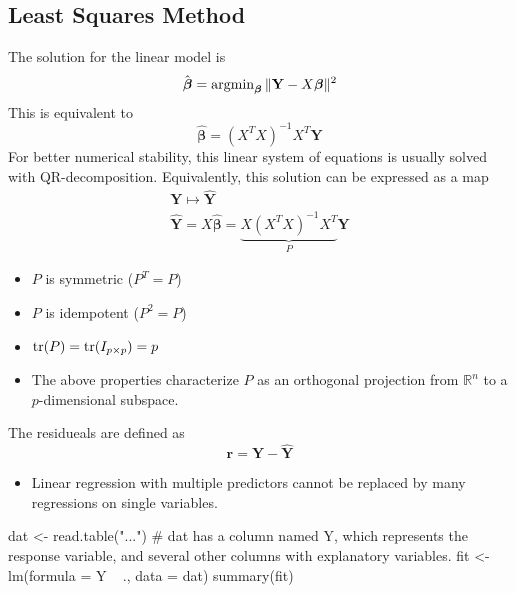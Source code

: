 \subsection{Least Squares Method}
\begin{theory}
 The solution for the linear model is
 \begin{equation*}
  \hat{\boldsymbol{\beta}} = \operatorname{arg min}_{\boldsymbol{\beta}} \|\mathbf{Y} - X\boldsymbol{\beta}\|^2
 \end{equation*}
 This is equivalent to
 \begin{equation*}
  \hat{\boldsymbol{\beta}} = (X^TX)^{-1}X^T\mathbf{Y}
 \end{equation*}
 For better numerical stability, this linear system of equations is usually solved with QR-decomposition.
 Equivalently, this solution can be expressed as a map
 \begin{gather*}
  \mathbf{Y} \mapsto \hat{\mathbf{Y}}\\
  \hat{\mathbf{Y}} = X\hat{\boldsymbol{\beta}} = \underbrace{X(X^TX)^{-1}X^T}_P \mathbf{Y}
 \end{gather*}
 \begin{itemize}
  \item $P$ is symmetric ($P^T = P$)
  \item $P$ is idempotent ($P^2 = P$)
  \item $\operatorname{tr}(P) = \operatorname{tr}(I_{p\times p}) = p$
  \item The above properties characterize $P$ as an orthogonal projection from $\mathbb{R}^n$ to a $p$-dimensional subspace.
 \end{itemize}
 The residueals are defined as
 \begin{equation*}
  \mathbf{r} = \mathbf{Y} - \hat{\mathbf{Y}}
 \end{equation*}

\end{theory}
\begin{application}
 \begin{itemize}
  \item Linear regression with multiple predictors cannot be replaced by many regressions on single variables.
 \end{itemize}

\end{application}
\begin{code}
 dat <- read.table("...") # dat has a column named Y, which represents the response variable, and several other columns with explanatory variables.
 fit <- lm(formula = Y ~ ., data = dat)
 summary(fit)
\end{code}

